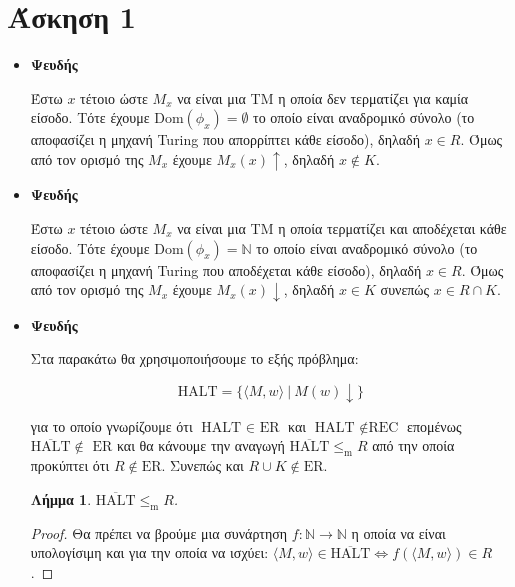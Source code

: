 \documentclass[a4paper, oneside, 11pt]{article}
\newcommand{\red}{\leq_{\text{m}}}
\newtheorem{lm}[thm]{Λήμμα}
\theoremstyle{definition}
\begin{document}
\section*{Άσκηση 1}

\begin{itemize}
   \item \textbf{Ψευδής}
   
         Έστω $x$ τέτοιο ώστε $M_x$ να είναι μια TM η οποία δεν τερματίζει για καμία
         είσοδο.  Τότε έχουμε $\text{Dom}(\phi_x) = \emptyset$ το οποίο είναι
         αναδρομικό σύνολο (το αποφασίζει η μηχανή Turing που απορρίπτει κάθε
         είσοδο), δηλαδή $x \in R$. Όμως από τον ορισμό της $M_x$ έχουμε $M_x(x)
         \uparrow$, δηλαδή $x \notin K$.

   \item \textbf{Ψευδής}

         Έστω $x$ τέτοιο ώστε $M_x$ να είναι μια TM η οποία τερματίζει και
         αποδέχεται κάθε είσοδο.
         Τότε έχουμε $\text{Dom}(\phi_x) = \mathbb{N}$ το οποίο είναι
         αναδρομικό σύνολο (το αποφασίζει η μηχανή Turing που αποδέχεται κάθε
         είσοδο), δηλαδή $x \in R$. Όμως από τον ορισμό της $M_x$ έχουμε $M_x(x)
         \downarrow$, δηλαδή $x \in K$ συνεπώς $x \in R \cap K$.

   \item \textbf{Ψευδής}

         Στα παρακάτω θα χρησιμοποιήσουμε το εξής πρόβλημα:

         \[ \text{HALT} = \{ \langle M, w \rangle\ |\ M(w) \downarrow \} \]

         για το οποίο γνωρίζουμε ότι $\text{HALT } \in \text{ ER}$ και
         $\text{HALT } \notin \text{REC}$ επομένως
         $\overline{\text{HALT} } \notin \text{ ER}$ και θα κάνουμε την
         αναγωγή $\overline{\text{HALT} } \red R$ από την οποία
         προκύπτει ότι $R \notin \text{ER}$. Συνεπώς και $R \cup K \notin \text{ER}$.

         \begin{lm}
            $\overline{\text{HALT}} \red R$.
         \end{lm}
         \begin{proof}
            Θα πρέπει να βρούμε μια συνάρτηση $f : \mathbb{N} \rightarrow \mathbb{N}$
            η οποία να είναι υπολογίσιμη και για την οποία
            να ισχύει:
            $\langle M, w \rangle \in \overline{\text{HALT}} \Leftrightarrow
               f(\langle M, w \rangle) \in R$.


\end{proof}
\end{itemize}
\end{document}

